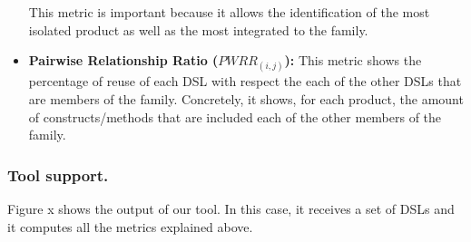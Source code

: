 \begin{itemize}
\hspace{3mm} This metric is important because it allows the identification of the most isolated product as well as the most integrated to the family.

\vspace{2mm}
\item \textbf{Pairwise Relationship Ratio ($PWRR_{(i,j)}$):} 
This metric shows the percentage of reuse of each DSL with respect the each of the other DSLs that are members of the family. Concretely, it shows, for each product, the amount of constructs/methods that are included each of the other members of the family.
\end{itemize}

\subsubsection{Tool support.} Figure x shows the output of our tool. In this case, it receives a set of DSLs and it computes all the metrics explained above. 
